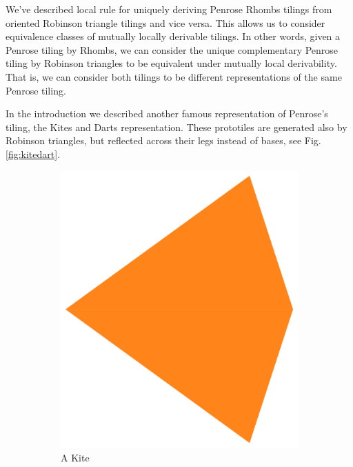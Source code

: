 \documentclass[
  oneside,
  11pt, a4paper,
  footinclude=true,
  headinclude=true,
  cleardoublepage=empty
]{scrbook}
\begin{document}
We've described local rule for uniquely deriving Penrose Rhombs tilings from oriented Robinson triangle tilings and vice versa. This allows us to consider equivalence classes of mutually locally derivable tilings. In other words, given a Penrose tiling by Rhombs, we can consider the unique complementary Penrose tiling by Robinson triangles to be equivalent under mutually local derivability. That is, we can consider both tilings to be different representations of the same Penrose tiling.

In the introduction we described another famous representation of Penrose's tiling, the Kites and Darts representation. These prototiles are generated also by Robinson triangles, but reflected across their legs instead of bases, see Fig.\ref{fig:kitedart}.

\begin{figure}
\begin{subfigure}[t]{0.37\textwidth}
\includegraphics[width=\textwidth]{kite}
\caption{A Kite}
\end{subfigure}\hfill
\begin{subfigure}[t]{0.3\textwidth}

\end{subfigure}
\end{figure}
\end{document}
